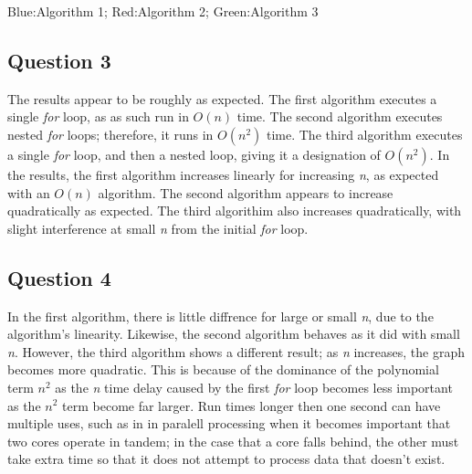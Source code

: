 \documentclass[11pt]{article} %
\begin{document}
Blue:Algorithm 1; Red:Algorithm 2; Green:Algorithm 3

\subsection{Question 3}
The results appear to be roughly as expected. The first algorithm executes a single \textit{for} loop, as as such run in $O(n)$ time. The second algorithm executes nested \textit{for} loops; therefore, it runs in $O(n^2)$ time. The third algorithm executes a single \textit{for} loop, and then a nested loop, giving it a designation of $O(n^2)$. In the results, the first algorithm increases linearly for increasing \textit{n}, as expected with an $O(n)$ algorithm. The second algorithm appears to increase quadratically as expected. The third algorithim also increases quadratically, with slight interference at small \textit{n} from the initial \textit{for} loop. 

\subsection{Question 4}
In the first algorithm, there is little diffrence for large or small \textit{n}, due to the algorithm's linearity. Likewise, the second algorithm behaves as it did with small \textit{n}. However, the third algorithm shows a different result; as \textit{n} increases, the graph becomes more quadratic. This is because of the dominance of the polynomial term $n^2$ as the \textit{n} time delay caused by the first \textit{for} loop becomes less important as the \textit{$n^2$} term become far larger. Run times longer then one second can have multiple uses, such as in in paralell processing when it becomes important that two cores operate in tandem; in the case that a core falls behind, the other must take extra time so that it does not attempt to process data that doesn't exist. 
\end{document}
